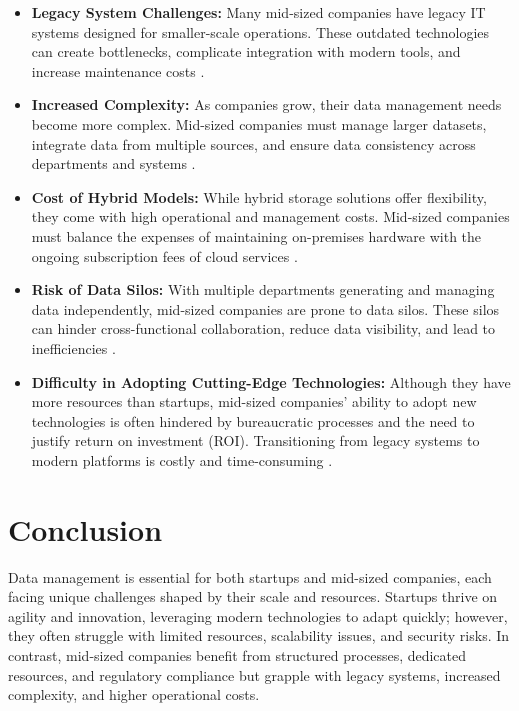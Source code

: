 \documentclass{article}
\begin{document}
\begin{itemize}
    \item \textbf{Legacy System Challenges:} Many mid-sized companies have legacy IT systems designed for smaller-scale operations. These outdated technologies can create bottlenecks, complicate integration with modern tools, and increase maintenance costs \cite{brown2018hidden}.
    
    \item \textbf{Increased Complexity:} As companies grow, their data management needs become more complex. Mid-sized companies must manage larger datasets, integrate data from multiple sources, and ensure data consistency across departments and systems \cite{deloitte2020complexity}.
    
    \item \textbf{Cost of Hybrid Models:} While hybrid storage solutions offer flexibility, they come with high operational and management costs. Mid-sized companies must balance the expenses of maintaining on-premises hardware with the ongoing subscription fees of cloud services \cite{techrepublic2021hybrid}.
    
    \item \textbf{Risk of Data Silos:} With multiple departments generating and managing data independently, mid-sized companies are prone to data silos. These silos can hinder cross-functional collaboration, reduce data visibility, and lead to inefficiencies \cite{hbr2018silos}.
    
    \item \textbf{Difficulty in Adopting Cutting-Edge Technologies:} Although they have more resources than startups, mid-sized companies' ability to adopt new technologies is often hindered by bureaucratic processes and the need to justify return on investment (ROI). Transitioning from legacy systems to modern platforms is costly and time-consuming \cite{accenture2019adoption}.
\end{itemize}

\section*{Conclusion}

Data management is essential for both startups and mid-sized companies, each facing unique challenges shaped by their scale and resources. Startups thrive on agility and innovation, leveraging modern technologies to adapt quickly; however, they often struggle with limited resources, scalability issues, and security risks. In contrast, mid-sized companies benefit from structured processes, dedicated resources, and regulatory compliance but grapple with legacy systems, increased complexity, and higher operational costs.
\end{document}
